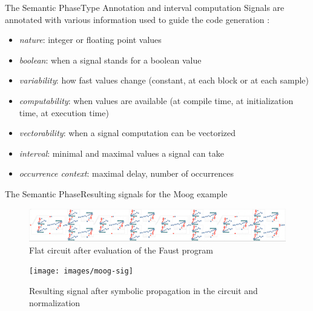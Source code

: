 \begin{frame}[fragile]{The Semantic Phase}{Type Annotation and interval computation}
Signals are annotated with various information used to guide the code generation :

\begin{itemize}
\item \emph{nature}: integer or floating point values
\item \emph{boolean}: when a signal stands for a boolean value
\item \emph{variability}: how fast values change (constant, at each block or at each sample)
\item \emph{computability}: when values are available (at compile time, at initialization time, at execution time)
\item \emph{vectorability}: when a signal computation can be vectorized
\item \emph{interval}: minimal and maximal values a signal can take
\item \emph{occurrence context}: maximal delay, number of occurrences
\end{itemize}


\end{frame}



\begin{frame}[fragile]{The Semantic Phase}{Resulting signals for the Moog example}

\begin{figure}
\includegraphics[width=1\columnwidth]{images/flat-moog-circuit}
\caption{Flat circuit after evaluation of the Faust program}
\end{figure}

\begin{figure}
\texttt{[image: images/moog-sig]}
\caption{Resulting signal after symbolic propagation in the circuit and normalization}
\end{figure}


\end{frame}
